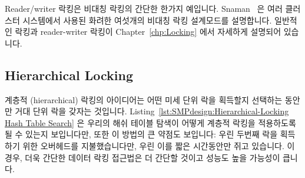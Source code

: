 Reader/writer 락킹은 비대칭 락킹의 간단한 한가지 예입니다.
Snaman~\cite{Snaman87} 은 여러 클러스터 시스템에서 사용된 화려한 여섯개의
비대칭 락킹 설계모드를 설명합니다.
일반적인 락킹과 reader-writer 락킹이
Chapter~\ref{chp:Locking} 에서 자세하게 설명되어 있습니다.

\subsection{Hierarchical Locking}
\label{sec:SMPdesign:Hierarchical Locking}

계층적 (hierarchical) 락킹의 아이디어는 어떤 미세 단위 락을 획득할지 선택하는
동안만 거대 단위 락을 갖자는 것입니다.
Listing~\ref{lst:SMPdesign:Hierarchical-Locking Hash Table Search}
은 우리의 해쉬 테이블 탐색이 어떻게 계층적 락킹을 적용하도록 될 수 있는지
보입니다만, 또한 이 방법의 큰 약점도 보입니다:
우린 두번째 락을 획득하기 위한 오버헤드를 지불했습니다만, 우린 이를 짧은
시간동안만 쥐고 있습니다.
이 경우, 더욱 간단한 데이터 락킹 접근법은 더 간단할 것이고 성능도 높을 가능성이
큽니다.

